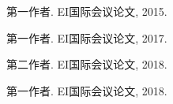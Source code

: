 
\begin{publications}{99}
    \item\textsc{第一作者}. {EI国际会议论文}, 2015.
    \item\textsc{第一作者}. {EI国际会议论文}, 2017.
    \item\textsc{第二作者}. {EI国际会议论文}, 2018.
    \item\textsc{第一作者}. {EI国际会议论文}, 2018.
\end{publications}
